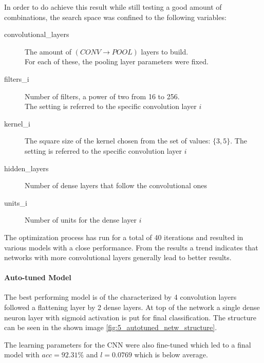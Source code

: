 In order to do achieve this result while still testing a good amount of combinations, the search space
was confined to the following variables:
\begin{description}
    \item [convolutional\_layers] The amount of $(CONV \rightarrow POOL)$ layers to build.\\
    For each of these, the pooling layer parameters were fixed.
    \item[filters\_i] Number of filters, a power of two from 16 to 256.\\
    The setting is referred to the specific convolution layer $i$
    \item[kernel\_i] The square size of the kernel chosen from the set of values: $\{3,5\}$.
    The setting is referred to the specific convolution layer $i$
    \item[hidden\_layers] Number of dense layers that follow the convolutional ones
    \item[units\_i] Number of units for the dense layer $i$
\end{description}

The optimization process has run for a total of 40 iterations and resulted in various models with a close performance.
From the results a trend indicates that networks with more convolutional layers generally lead to better results.

\paragraph{Auto-tuned Model}

The best performing model is of the characterized by 4 convolution layers followed a flattening layer by 2 dense layers.
At top of the network a single dense neuron layer with sigmoid activation is put for final classification.
The structure can be seen in the shown image \ref{fig:5_autotuned_netw_structure}.

The learning parameters for the CNN were also fine-tuned which led to a final model with $acc=92.31\%$ and $l=0.0769$
which is below average.

